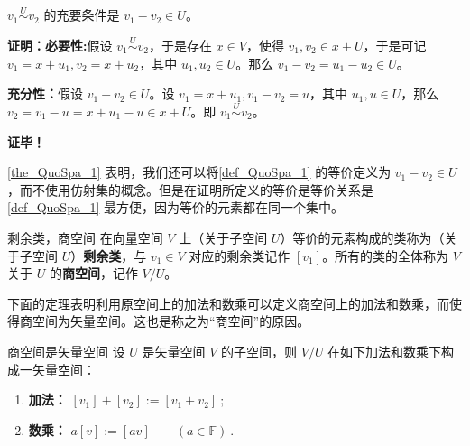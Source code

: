 
\begin{theorem}{}\label{the_QuoSpa_1}
 $v_1\overset{U}{\sim} v_2$ 的充要条件是 $v_1-v_2\in U$。
\end{theorem}
\textbf{证明：}\textbf{必要性:}假设 $v_1\overset{U}{\sim} v_2$，于是存在 $x\in V$，使得 $v_1,v_2\in x+U$，于是可记 $v_1=x+u_1,v_2=x+u_2$，其中 $u_1,u_2\in U$。那么 $v_1-v_2=u_1-u_2\in U$。

\textbf{充分性：}假设 $v_1-v_2\in U$。设 $v_1=x+u_1,v_1-v_2=u$，其中 $u_1,u\in U$，那么 $v_2=v_1-u=x+u_1-u\in x+U$。即 $v_1\overset{U}{\sim} v_2$。

\textbf{证毕！}

\autoref{the_QuoSpa_1} 表明，我们还可以将\autoref{def_QuoSpa_1} 的等价定义为 $v_1-v_2\in U$，而不使用仿射集的概念。但是在证明所定义的等价是等价关系是\autoref{def_QuoSpa_1} 最方便，因为等价的元素都在同一个集中。
\begin{definition}{剩余类，商空间}\label{def_QuoSpa_2}
在向量空间 $V$ 上（关于子空间 $U$）等价的元素构成的类称为（关于子空间 $U$）\textbf{剩余类}，与 $v_1\in V$ 对应的剩余类记作 $[v_1]$。所有的类的全体称为 $V$ 关于 $U$ 的\textbf{商空间}，记作 $V/U$。
\end{definition}

下面的定理表明利用原空间上的加法和数乘可以定义商空间上的加法和数乘，而使得商空间为矢量空间。这也是称之为“商空间”的原因。

\begin{theorem}{商空间是矢量空间}\label{the_QuoSpa_2}
设 $U$ 是矢量空间 $V$ 的子空间，则 $V/U$ 在如下加法和数乘下构成一矢量空间：
\begin{enumerate}
\item \textbf{加法：}
$[v_1] + [v_2] := [v_1 + v_2]~;$
\item \textbf{数乘：} $a [v] := [a v]\qquad (a \in \mathbb F)~.$
\end{enumerate}
\end{theorem}

